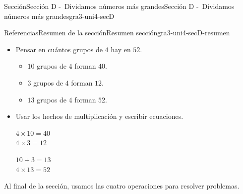 \documentclass[twoside,10pt,]{article}
\begin{document}
\begin{sectionptx}{Sección}{Sección D -~Dividamos números más grandes}{}{Sección D -~Dividamos números más grandes}{}{}{gra3-uni4-secD}
\begin{references-subsection}{Referencias}{Resumen de la sección}{}{Resumen sección}{}{}{gra3-uni4-secD-resumen}
\begin{itemize}[label=\textbullet]
\begin{image}{0}{1}{0}{}
\end{image}%
\item{}Pensar en cuántos grupos de \(4\) hay en \(52\).%
%
\begin{itemize}[label=$\circ$]
\item{}\(10\) grupos de \(4\) forman \(40\).%
\item{}\(3\) grupos de \(4\) forman \(12\).%
\item{}\(13\) grupos de \(4\) forman \(52\).%
\end{itemize}
\item{}Usar los hechos de multiplicación y escribir ecuaciones.%
\begin{sidebyside}{2}{0}{0.2}{0}%
\begin{sbspanel}{0.4}%
\(4 \times 10 = 40\)\\
 \(4 \times 3 = 12\)%
\end{sbspanel}%
\begin{sbspanel}{0.4}%
\par
\(10 + 3 = 13\)\\
 \(4 \times 13 = 52\)%
\end{sbspanel}%
\end{sidebyside}%
\end{itemize}
Al final de la sección, usamos las cuatro operaciones para resolver problemas.%
\end{references-subsection}
\end{sectionptx}
%
%
\typeout{************************************************}
\typeout{************************************************}
%
\end{document}
